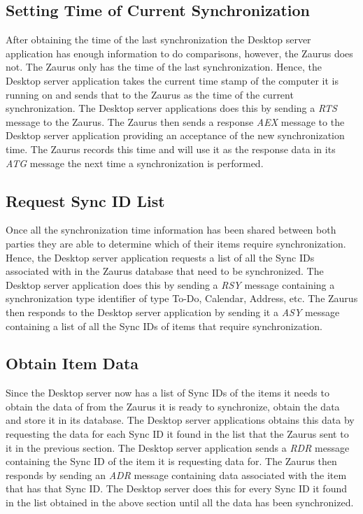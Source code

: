     \subsection{Setting Time of Current Synchronization}
    After obtaining the time of the last synchronization the Desktop server
    application has enough information to do comparisons, however, the Zaurus
    does not. The Zaurus only has the time of the last synchronization. Hence,
    the Desktop server application takes the current time stamp of the
    computer it is running on and sends that to the Zaurus as the time of the
    current synchronization. The Desktop server applications does this by
    sending a \emph{RTS} message to the Zaurus. The Zaurus then sends a
    response \emph{AEX} message to the Desktop server application providing an
    acceptance of the new synchronization time. The Zaurus records this time
    and will use it as the response data in its \emph{ATG} message the next
    time a synchronization is performed.

    \subsection{Request Sync ID List}
    Once all the synchronization time information has been shared between both
    parties they are able to determine which of their items require
    synchronization. Hence, the Desktop server application requests a list of
    all the Sync IDs associated with in the Zaurus database that need to be
    synchronized. The Desktop server application does this by sending a
    \emph{RSY} message containing a synchronization type identifier of type
    To-Do, Calendar, Address, etc. The Zaurus then responds to the Desktop
    server application by sending it a \emph{ASY} message containing a list of
    all the Sync IDs of items that require synchronization.

    \subsection{Obtain Item Data}
    Since the Desktop server now has a list of Sync IDs of the items it needs
    to obtain the data of from the Zaurus it is ready to synchronize, obtain
    the data and store it in its database. The Desktop server applications
    obtains this data by requesting the data for each Sync ID it found in the
    list that the Zaurus sent to it in the previous section. The Desktop
    server application sends a \emph{RDR} message containing the Sync ID of
    the item it is requesting data for. The Zaurus then responds by sending an
    \emph{ADR} message containing data associated with the item that has that
    Sync ID. The Desktop server does this for every Sync ID it found in the
    list obtained in the above section until all the data has been
    synchronized.

